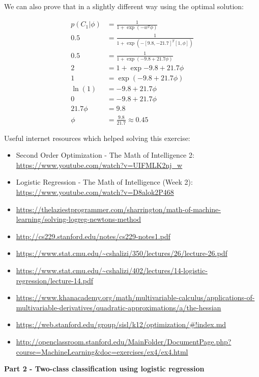 \documentclass[a4paper]{article}
\begin{document}
We can also prove that in a slightly different way using the optimal solution:

\begin{align*}
p(C_1 | \phi) &= \frac{1}{1 + \exp(-w^T \phi)}\\
0.5 &= \frac{1}{1 + \exp(-[9.8, -21.7]^T [1, \phi])}\\
0.5 &= \frac{1}{1 + \exp(-9.8 + 21.7 \phi)}\\
2 &= 1 + \exp{-9.8 + 21.7 \phi}\\
1 &= \exp(-9.8 + 21.7 \phi)\\
\ln(1) &= -9.8 + 21.7 \phi\\
0 &= -9.8 + 21.7 \phi\\
21.7 \phi &= 9.8\\
\phi &= \frac{9.8}{21.7} \approx 0.45
\end{align*}


Useful internet resources which helped solving this exercise:

\begin{itemize}
	\item Second Order Optimization - The Math of Intelligence 2: \url{https://www.youtube.com/watch?v=UIFMLK2nj_w}
	\item Logistic Regression - The Math of Intelligence (Week 2): \url{https://www.youtube.com/watch?v=D8alok2P468}
	\item \url{https://thelaziestprogrammer.com/sharrington/math-of-machine-learning/solving-logreg-newtons-method}
	\item \url{http://cs229.stanford.edu/notes/cs229-notes1.pdf}
	\item \url{https://www.stat.cmu.edu/~cshalizi/350/lectures/26/lecture-26.pdf}
	\item \url{https://www.stat.cmu.edu/~cshalizi/402/lectures/14-logistic-regression/lecture-14.pdf}
	\item \url{https://www.khanacademy.org/math/multivariable-calculus/applications-of-multivariable-derivatives/quadratic-approximations/a/the-hessian}
	\item \url{https://web.stanford.edu/group/sisl/k12/optimization/#!index.md}
	\item \url{http://openclassroom.stanford.edu/MainFolder/DocumentPage.php?course=MachineLearning&doc=exercises/ex4/ex4.html}
\end{itemize}




\textbf{Part 2 - Two-class classification using logistic regression}\\
\end{document}
